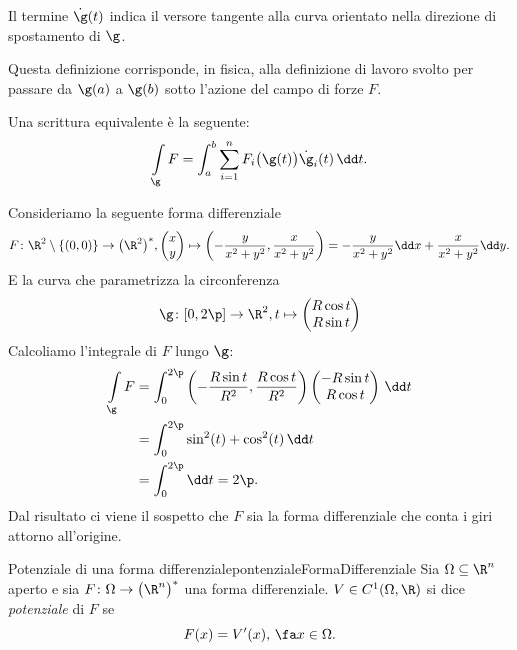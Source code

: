 \begin{oss}
	Il termine \(\dot{\g}(t)\) indica il versore tangente alla curva orientato nella direzione di spostamento di \(\g\).
\end{oss}

\begin{oss}
	Questa definizione corrisponde, in fisica, alla definizione di lavoro svolto per passare da \(\g(a)\) a \(\g(b)\) sotto l'azione del campo di forze \(F\).
\end{oss}

\begin{oss}
	Una scrittura equivalente è la seguente:
	\[
		\int\limits_\g F = \int_a^b \sum_{i=1}^n F_i \big(\g(t)\big) \dot{\g}_i(t)\,\dd t.
	\]
\end{oss}

\begin{ese}
	Consideriamo la seguente forma differenziale
	\[
		F\colon \R^2\setminus\{(0,0)\} \to \big(\R^2\big)^*, 	\begin{pmatrix}
			x \\
			y
		\end{pmatrix}
		\mapsto \left( -\frac{y}{x^2+y^2},\frac{x}{x^2+y^2} \right) = -\frac{y}{x^2+y^2}\dd x + \frac{x}{x^2+y^2}\dd y.
	\]
	E la curva che parametrizza la circonferenza
	\[
		\g\colon [0,2\p] \to \R^2, t\mapsto \begin{pmatrix}
			R \cos t \\
			R \sin t
		\end{pmatrix}
	\]
	Calcoliamo l'integrale di \(F\) lungo \(\g\):
	\[
		\begin{split}
			\int\limits_\g F & = \int_0^{2\p} \left( -\frac{R\sin t}{R^2}, \frac{R\cos t}{R^2} \right) \begin{pmatrix}-R\sin t\\R\cos t\end{pmatrix}\,\dd t\\
			& = \int_0^{2\p} \sin^2(t)+\cos^2(t)\,\dd t\\
			& = \int_0^{2\p} \dd t = 2\p.
		\end{split}
	\]
	Dal risultato ci viene il sospetto che \(F\) sia la forma differenziale che conta i giri attorno all'origine.
\end{ese}

\begin{defn}{Potenziale di una forma differenziale}{pontenzialeFormaDifferenziale}
	Sia \(\Omega\subseteq\R^n\) aperto e sia \(F\colon \Omega\to \big(\R^n\big)^*\) una forma differenziale.
	\(V\in C^1(\Omega,\R)\) si dice \emph{potenziale} di \(F\) se
	\[
		F(x) = V'(x),\,\fa x\in \Omega.
	\]
\end{defn}

